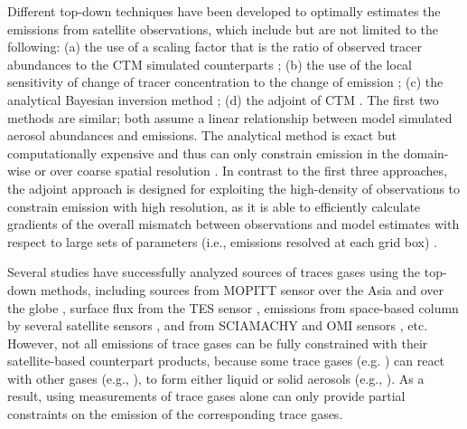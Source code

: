  Different top-down techniques have been developed to optimally estimates
the emissions from satellite observations, which include but are not limited 
to the following:
(a) the use of a scaling factor that is the ratio of observed tracer 
abundances to the CTM simulated counterparts \cite{Lee11, Martin03a, Wang06};
(b) the use of the local sensitivity of change of tracer concentration to the
change of emission \citep{Lamsal11, Walker10}; 
(c) the analytical Bayesian inversion method \citep[e.g.,][]{Heald04};  
(d) the adjoint of CTM \citep[e.g.,][]{Muller05, Henze07, Henze09,
Dubovik08, Kopacz09, Kopacz10, Wang12}.
The first two methods are similar; both assume a linear relationship between
model simulated aerosol abundances and emissions. The analytical method is
exact but computationally expensive and thus can only constrain emission in 
the domain-wise or over coarse spatial resolution \citep{Kopacz09}.
In contrast to the first three approaches, the adjoint approach is designed
for exploiting the high-density of observations to constrain emission
with high resolution, as it is able to efficiently calculate gradients of 
the overall mismatch between observations and model estimates with respect to
large sets of parameters (i.e., emissions resolved at each grid box) 
\citep{Henze07}.

 Several studies have successfully analyzed sources of traces gases using the
top-down methods, including  sources from MOPITT sensor over the Asia
\citep{Heald04, Kopacz09} and over the globe \citep[e.g.,][]{Stavrakou06, 
Kopacz10},  surface flux from the TES sensor \citep{Nassar11}, 
 emissions from space-based column  by several satellite 
sensors \citep{Lamsal11, Lin10, Martin03a, Muller05}, and  from 
SCIAMACHY and OMI sensors \citep{Lee11}, etc. However, not all emissions of
trace gases can be fully constrained with their satellite-based counterpart 
products, because some trace gases (e.g. ) can react with other gases
(e.g., ), to form either liquid or solid aerosols 
(e.g., ). As a result, using measurements of trace gases alone 
can only provide partial constraints on the emission of the corresponding 
trace gases.

